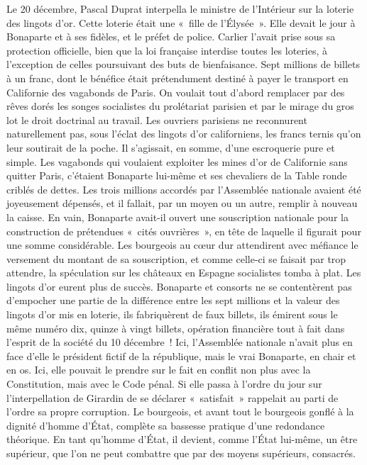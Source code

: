 \documentclass[french,twoside]{book} %
\begin{document}
Le 20 décembre, Pascal Duprat interpella le ministre de l’Intérieur sur la loterie des lingots d’or. Cette loterie était une « fille de l’Élysée ». Elle devait le jour à Bonaparte et à ses fidèles, et le préfet de police. Carlier l’avait prise sous sa protection officielle, bien que la loi française interdise toutes les loteries, à l’exception de celles poursuivant des buts de bienfaisance. Sept millions de billets à un franc, dont le bénéfice était prétendument destiné à payer le transport en Californie des vagabonds de Paris. On voulait tout d’abord remplacer par des rêves dorés les songes socialistes du prolétariat parisien et par le mirage du gros lot le droit doctrinal au travail. Les ouvriers parisiens ne reconnurent naturellement pas, sous l’éclat des lingots d’or californiens, les francs ternis qu’on leur soutirait de la poche. Il s’agissait, en somme, d’une escroquerie pure et simple. Les vagabonds qui voulaient exploiter les mines d’or de Californie sans quitter Paris, c’étaient Bonaparte lui-même et ses chevaliers de la Table ronde criblés de dettes. Les trois millions accordés par l’Assemblée nationale avaient été joyeusement dépensés, et il fallait, par un moyen ou un autre, remplir à nouveau la caisse. En vain, Bonaparte avait-il ouvert une souscription nationale pour la construction de prétendues « cités ouvrières », en tête de laquelle il figurait pour une somme considérable. Les bourgeois au cœur dur attendirent avec méfiance le versement du montant de sa souscription, et comme celle-ci se faisait par trop attendre, la spéculation sur les châteaux en Espagne socialistes tomba à plat. Les lingots d’or eurent plus de succès. Bonaparte et consorts ne se contentèrent pas d’empocher une partie de la différence entre les sept millions et la valeur des lingots d’or mis en loterie, ils fabriquèrent de faux billets, ils émirent sous le même numéro dix, quinze à vingt billets, opération financière tout à fait dans l’esprit de la société du 10 décembre ! Ici, l’Assemblée nationale n’avait plus en face d’elle le président fictif de la république, mais le vrai Bonaparte, en chair et en os. Ici, elle pouvait le prendre sur le fait en conflit non plus avec la Constitution, mais avec le Code pénal. Si elle passa à l’ordre du jour sur l’interpellation de Girardin de se déclarer « satisfait » rappelait au parti de l’ordre sa propre corruption. Le bourgeois, et avant tout le bourgeois gonflé à la dignité d’homme d’État, complète sa bassesse pratique d’une redondance théorique. En tant qu’homme d’État, il devient, comme l’État lui-même, un être supérieur, que l’on ne peut combattre que par des moyens supérieurs, consacrés.\par
\end{document}
